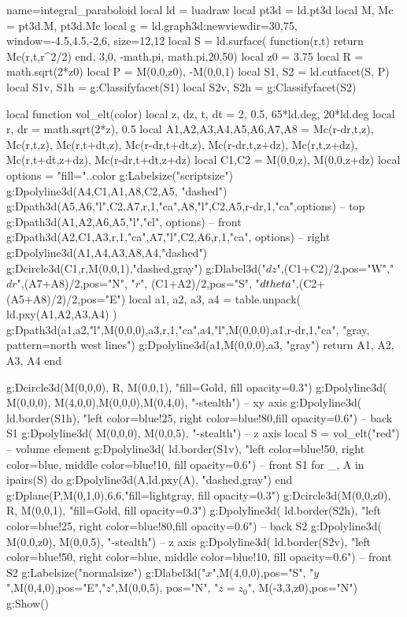 \documentclass[border=5pt]{standalone}%
\begin{document}
\begin{luadraw}{name=integral_paraboloid}
local ld = luadraw
local pt3d = ld.pt3d
local M, Mc = pt3d.M, pt3d.Mc
local g = ld.graph3d:new{viewdir={30,75}, window={-4.5,4.5,-2,6}, size={12,12}}
local S = ld.surface( function(r,t) return Mc(r,t,r^2/2) end, 3,0, -math.pi, math.pi,{20,50})
local z0 = 3.75
local R = math.sqrt(2*z0)
local P = {M(0,0,z0), -M(0,0,1)}
local S1, S2 = ld.cutfacet(S, P)
local S1v, S1h = g:Classifyfacet(S1)
local S2v, S2h = g:Classifyfacet(S2)

local function vol_elt(color)
    local z, dz, t, dt = 2, 0.5, 65*ld.deg, 20*ld.deg
    local r, dr = math.sqrt(2*z), 0.5
    local A1,A2,A3,A4,A5,A6,A7,A8 = Mc(r-dr,t,z), Mc(r,t,z), Mc(r,t+dt,z), Mc(r-dr,t+dt,z), Mc(r-dr,t,z+dz), Mc(r,t,z+dz), Mc(r,t+dt,z+dz), Mc(r-dr,t+dt,z+dz)
    local C1,C2 = M(0,0,z), M(0,0,z+dz)
    local options = "fill="..color
    g:Labelsize("scriptsize")
    g:Dpolyline3d({{A4,C1,A1},{A8,C2,A5}}, "dashed")
    g:Dpath3d({A5,A6,"l",C2,A7,r,1,"ca",A8,"l",C2,A5,r-dr,1,"ca"},options) -- top
    g:Dpath3d({A1,A2,A6,A5,"l","cl"}, options) -- front
    g:Dpath3d({A2,C1,A3,r,1,"ca",A7,"l",C2,A6,r,1,"ca"}, options) -- right
    g:Dpolyline3d({{A1,A4,A3},{A8,A4}},"dashed")
    g:Dcircle3d(C1,r,M(0,0,1),"dashed,gray")
    g:Dlabel3d("$dz$",(C1+C2)/2,{pos="W"},"$dr$",(A7+A8)/2,{pos="N"}, 
        "$r$", (C1+A2)/2,{pos="S"}, "$d\\theta$",(C2+(A5+A8)/2)/2,{pos="E"})
    local a1, a2, a3, a4 = table.unpack( ld.pxy({A1,A2,A3,A4}) ) 
    g:Dpath3d({a1,a2,"l",M(0,0,0),a3,r,1,"ca",a4,"l",M(0,0,0),a1,r-dr,1,"ca"}, 
        "gray, pattern=north west lines")
    g:Dpolyline3d({a1,M(0,0,0),a3}, "gray")
    return {A1, A2, A3, A4}
end

g:Dcircle3d(M(0,0,0), R, M(0,0,1), "fill=Gold, fill opacity=0.3")
g:Dpolyline3d( {{M(0,0,0), M(4,0,0)},{M(0,0,0),M(0,4,0)}}, "-stealth") -- xy axis
g:Dpolyline3d( ld.border(S1h), "left color=blue!25, right color=blue!80,fill opacity=0.6") -- back S1
g:Dpolyline3d( {M(0,0,0), M(0,0,5)}, "-stealth") -- z axis
local S = vol_elt("red") -- volume element
g:Dpolyline3d( ld.border(S1v), "left color=blue!50, right color=blue, middle color=blue!10, fill opacity=0.6") -- front S1
for _, A in ipairs(S)  do
    g:Dpolyline3d({A,ld.pxy(A)}, "dashed,gray") 
end
g:Dplane(P,M(0,1,0),6,6,"fill=lightgray, fill opacity=0.3")
g:Dcircle3d(M(0,0,z0), R, M(0,0,1), "fill=Gold, fill opacity=0.3")
g:Dpolyline3d( ld.border(S2h), "left color=blue!25, right color=blue!80,fill opacity=0.6") -- back S2
g:Dpolyline3d( {M(0,0,z0), M(0,0,5)}, "-stealth") -- z axis
g:Dpolyline3d( ld.border(S2v), "left color=blue!50, right color=blue, middle color=blue!10, fill opacity=0.6") -- front S2
g:Labelsize("normalsize")
g:Dlabel3d("$x$",M(4,0,0),{pos="S"}, "$y$",M(0,4,0),{pos="E"},"$z$",M(0,0,5), {pos="N"},
    "$z=z_0$", M(-3,3,z0),{pos="N"})
g:Show()
\end{luadraw}
\end{document}
